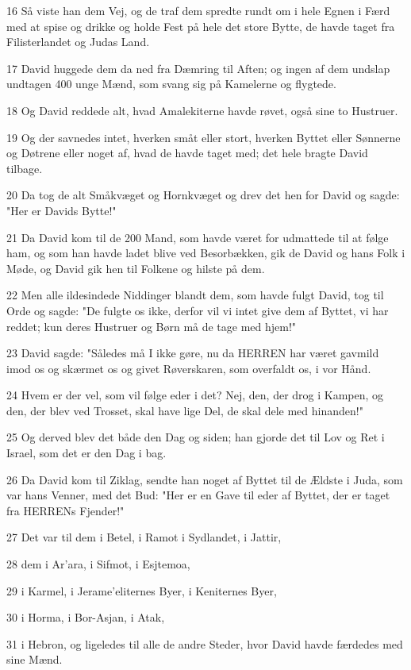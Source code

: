 \par 16 Så viste han dem Vej, og de traf dem spredte rundt om i hele Egnen i Færd med at spise og drikke og holde Fest på hele det store Bytte, de havde taget fra Filisterlandet og Judas Land.
\par 17 David huggede dem da ned fra Dæmring til Aften; og ingen af dem undslap undtagen 400 unge Mænd, som svang sig på Kamelerne og flygtede.
\par 18 Og David reddede alt, hvad Amalekiterne havde røvet, også sine to Hustruer.
\par 19 Og der savnedes intet, hverken småt eller stort, hverken Byttet eller Sønnerne og Døtrene eller noget af, hvad de havde taget med; det hele bragte David tilbage.
\par 20 Da tog de alt Småkvæget og Hornkvæget og drev det hen for David og sagde: "Her er Davids Bytte!"
\par 21 Da David kom til de 200 Mand, som havde været for udmattede til at følge ham, og som han havde ladet blive ved Besorbækken, gik de David og hans Folk i Møde, og David gik hen til Folkene og hilste på dem.
\par 22 Men alle ildesindede Niddinger blandt dem, som havde fulgt David, tog til Orde og sagde: "De fulgte os ikke, derfor vil vi intet give dem af Byttet, vi har reddet; kun deres Hustruer og Børn må de tage med hjem!"
\par 23 David sagde: "Således må I ikke gøre, nu da HERREN har været gavmild imod os og skærmet os og givet Røverskaren, som overfaldt os, i vor Hånd.
\par 24 Hvem er der vel, som vil følge eder i det? Nej, den, der drog i Kampen, og den, der blev ved Trosset, skal have lige Del, de skal dele med hinanden!"
\par 25 Og derved blev det både den Dag og siden; han gjorde det til Lov og Ret i Israel, som det er den Dag i bag.
\par 26 Da David kom til Ziklag, sendte han noget af Byttet til de Ældste i Juda, som var hans Venner, med det Bud: "Her er en Gave til eder af Byttet, der er taget fra HERRENs Fjender!"
\par 27 Det var til dem i Betel, i Ramot i Sydlandet, i Jattir,
\par 28 dem i Ar'ara, i Sifmot, i Esjtemoa,
\par 29 i Karmel, i Jerame'eliternes Byer, i Keniternes Byer,
\par 30 i Horma, i Bor-Asjan, i Atak,
\par 31 i Hebron, og ligeledes til alle de andre Steder, hvor David havde færdedes med sine Mænd.

